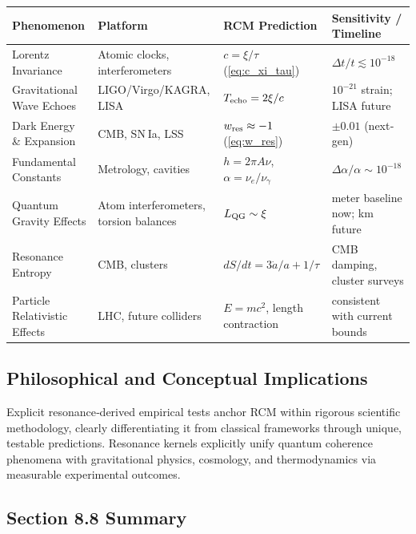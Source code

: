\begin{center}
\begin{tabular}{|l|l|l|l|}
\hline
Phenomenon                    & Platform                                & RCM Prediction                          & Sensitivity / Timeline         \\ \hline
Lorentz Invariance            & Atomic clocks, interferometers           & $c=\xi/\tau$ (\ref{eq:c_xi_tau})       & $\Delta t/t\lesssim10^{-18}$  \\ \hline
Gravitational Wave Echoes     & LIGO/Virgo/KAGRA, LISA                  & $T_{\rm echo}=2\xi/c$                  & $10^{-21}$ strain; LISA future \\ \hline
Dark Energy \& Expansion      & CMB, SN Ia, LSS                         & $w_{\rm res}\approx-1$ (\ref{eq:w_res}) & $\pm0.01$ (next‐gen)          \\ \hline
Fundamental Constants         & Metrology, cavities                     & $h=2\pi A\nu$, $\alpha=\nu_e/\nu_\gamma$& $\Delta\alpha/\alpha\sim10^{-18}$ \\ \hline
Quantum Gravity Effects       & Atom interferometers, torsion balances   & $L_{\rm QG}\sim\xi$                     & meter baseline now; km future \\ \hline
Resonance Entropy             & CMB, clusters                           & $dS/dt=3\dot a/a+1/\tau$               & CMB damping, cluster surveys   \\ \hline
Particle Relativistic Effects & LHC, future colliders                   & $E=mc^2$, length contraction           & consistent with current bounds  \\ \hline
\end{tabular}
\end{center}

\subsection{Philosophical and Conceptual Implications}

Explicit resonance‐derived empirical tests anchor RCM within rigorous scientific methodology, clearly differentiating it from classical frameworks through unique, testable predictions.\newline
Resonance kernels explicitly unify quantum coherence phenomena with gravitational physics, cosmology, and thermodynamics via measurable experimental outcomes.

\subsection{Section 8.8 Summary}

